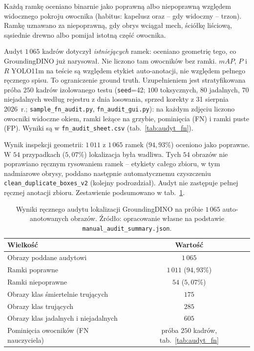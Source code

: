 Każdą ramkę oceniano binarnie jako poprawną albo niepoprawną względem widocznego pokroju owocnika (habitus: kapelusz oraz -- gdy widoczny -- trzon). Ramkę uznawano za niepoprawną, gdy obrys wciągał mech, ściółkę liściową, sąsiednie drewno albo pomijał istotną część owocnika.

Audyt $1\,065$ kadrów dotyczył \emph{istniejących} ramek: oceniano geometrię tego, co GroundingDINO już narysował. Nie liczono tam owocników bez ramki. $mAP$, $P$ i $R$ YOLO11m na teście są względem etykiet auto-anotacji, nie względem pełnego ręcznego spisu. To ograniczenie ground truth. Uzupełnieniem jest stratyfikowana próba $250$ kadrów izolowanego testu (\texttt{seed}=42; $100$ toksycznych, $80$ jadalnych, $70$ niejadalnych według rejestru z dnia losowania, sprzed korekty z 31 sierpnia 2026~r.; \texttt{sample\_fn\_audit.py}, \texttt{fn\_audit\_gui.py}): na każdym zdjęciu liczono owocniki widoczne okiem, ramki leżące na grzybie, pominięcia (FN) i ramki puste (FP). Wyniki są w \texttt{fn\_audit\_sheet.csv} (tab.~\ref{tab:audyt_fn}).

Wynik inspekcji geometrii: $1\,011$ z $1\,065$ ramek ($94{,}93\%$) oceniono jako poprawne. W $54$ przypadkach ($5{,}07\%$) lokalizacja była wadliwa. Tych $54$ obrazów nie poprawiano ręcznym rysowaniem ramek -- etykiety całego zbioru, w tym nadmiarowe obrysy, poddano następnie automatycznemu czyszczeniu \texttt{clean\_duplicate\_boxes\_v2} (kolejny podrozdział). Audyt nie zastępuje pełnej ręcznej anotacji zbioru. Zestawienie podsumowano w tab.~\ref{tab:audyt_grounding}.

\begin{table}[htbp]
 \centering
 \caption{Wyniki ręcznego audytu lokalizacji GroundingDINO na próbie $1\,065$ auto-anotowanych obrazów. Źródło: opracowanie własne na podstawie \texttt{manual\_audit\_summary.json}.}
 \label{tab:audyt_grounding}
 \begin{tabular}{|l|c|}
 \hline
 \textbf{Wielkość} & \textbf{Wartość} \\
 \hline \hline
 Obrazy poddane audytowi & $1\,065$ \\
 \hline
 Ramki poprawne & $1\,011$ \quad ($94{,}93\%$) \\
 \hline
 Ramki niepoprawne & $54$ \quad ($5{,}07\%$) \\
 \hline
 Obrazy klas śmiertelnie trujących & $175$ \\
 \hline
 Obrazy klas trujących & $285$ \\
 \hline
 Obrazy klas jadalnych i niejadalnych & $605$ \\
 \hline
 Pominięcia owocników (FN nauczyciela) & próba $250$ kadrów, tab.~\ref{tab:audyt_fn} \\
 \hline
 \end{tabular}
\end{table}

